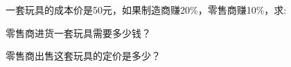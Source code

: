 一套玩具的成本价是50元，如果制造商赚20$\%$，零售商赚10$\%$，求:

\begin{subquestions}

    \subquestion 零售商进货一套玩具需要多少钱？

    \subquestion 零售商出售这套玩具的定价是多少？    

\end{subquestions}





